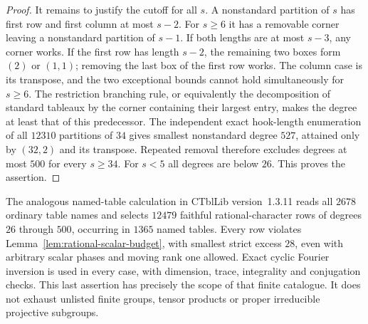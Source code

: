 \begin{proof}
It remains to justify the cutoff for all $s$.  A nonstandard
partition of $s$ has first row and first column at most $s-2$.
For $s\ge6$ it has a removable corner leaving a nonstandard
partition of $s-1$.  If both lengths are at most $s-3$, any
corner works.  If the first row has length $s-2$, the remaining
two boxes form $(2)$ or $(1,1)$; removing the last box of the
first row works.  The column case is its transpose, and the two
exceptional bounds cannot hold simultaneously for $s\ge6$.
The restriction branching rule, or equivalently the decomposition
of standard tableaux by the corner containing their largest entry,
makes the degree at least that of this predecessor.
The independent exact hook-length enumeration of all $12310$
partitions of $34$ gives smallest nonstandard degree $527$,
attained only by $(32,2)$ and its transpose.  Repeated removal
therefore excludes degrees at most $500$ for every $s\ge34$.
For $s<5$ all degrees are below $26$.  This proves the assertion.
\end{proof}

The analogous named-table calculation in CTblLib version~1.3.11
reads all $2678$ ordinary table names and selects $12479$ faithful
rational-character rows of degrees $26$ through $500$, occurring
in $1365$ named tables.  Every row violates
Lemma~\ref{lem:rational-scalar-budget}, with smallest strict
excess $28$, even with arbitrary scalar phases and moving rank
one allowed.  Exact cyclic Fourier inversion is used in every
case, with dimension, trace, integrality and conjugation checks.
This last assertion has precisely the scope of that finite
catalogue.  It does not exhaust unlisted finite groups, tensor
products or proper irreducible projective subgroups.
